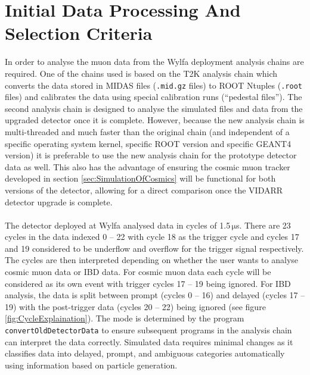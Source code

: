 \section{Initial Data Processing And Selection Criteria}\label{sec:muonAnalysisChain}
In order to analyse the muon data from the Wylfa deployment analysis chains are required. One of the chains used is based on the T2K analysis chain which converts the data stored in MIDAS \cite{ritt1997midas} files (\texttt{.mid.gz} files) to ROOT Ntuples (\texttt{.root} files) and calibrates the data using special calibration runs (``pedestal files''). The second analysis chain is designed to analyse the simulated files and data from the upgraded detector once it is complete. However, because the new analysis chain is multi-threaded and much faster than the original chain (and independent of a specific operating system kernel, specific ROOT version and specific GEANT4 version) it is preferable to use the new analysis chain for the prototype detector data as well. This also has the advantage of ensuring the cosmic muon tracker developed in section \ref{sec:SimulationOfCosmics} will be functional for both versions of the detector, allowing for a direct comparison once the VIDARR detector upgrade is complete. 
\\\\The detector deployed at Wylfa analysed data in cycles of 1.5\,$\mathrm{\mu}$s. There are 23 cycles in the data indexed 0 -- 22 with cycle 18 as the trigger cycle and cycles 17 and 19 considered to be underflow and overflow for the trigger signal respectively. The cycles are then interpreted depending on whether the user wants to analyse cosmic muon data or IBD data. For cosmic muon data each cycle will be considered as its own event with trigger cycles 17 -- 19 being ignored. For IBD analysis, the data is split between prompt (cycles 0 -- 16) and delayed (cycles 17 -- 19) with the post-trigger data (cycles 20 -- 22) being ignored (see figure \ref{fig:CycleExplaination}). The mode is determined by the program \texttt{convertOldDetectorData} to ensure subsequent programs in the analysis chain can interpret the data correctly. Simulated data requires minimal changes as it classifies data into delayed, prompt, and ambiguous categories automatically using information based on particle generation.

